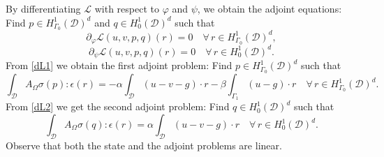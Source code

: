 \documentclass[preprint,9pt]{elsarticle}
\begin{document}
By differentiating $\mathcal{L}$ with respect to $\varphi$ and $\psi$,
we obtain the adjoint equations:
Find $p \in  H^1_{\Gamma_0}(\mathcal{D})^d$ and $ q\in H^1_0(\mathcal{D})^d$
such that
\begin{equation}\label{dL1}
	\partial_{\varphi}\mathcal{L}(u,v,p,q)(r)=0
	\quad \forall \, r \in  H^1_{\Gamma_0}(\mathcal{D})^d,
\end{equation}
\begin{equation}\label{dL2}
	\partial_{\psi}\mathcal{L}(u,v,p,q)(r)=0
	\quad\forall \, r \in  H^1_0(\mathcal{D})^d.
\end{equation}
From \eqref{dL1} we obtain the first adjoint problem:
Find $p \in  H^1_{\Gamma_0}(\mathcal{D})^d$ such that
\[
	\int_{\mathcal{D}} A_{\Omega}\sigma(p)\colon\!\epsilon(r) 
	= -\alpha \int_{\mathcal{D}} (u-v-g) \cdot r
	-\beta \int_{\Gamma_1} (u - g) \cdot r
	\quad \forall \, r \in H^1_{\Gamma_0}(\mathcal{D})^d.
\]
From \eqref{dL2} we get the second adjoint problem:
Find $q \in  H^1_{0}(\mathcal{D})^d$ such that
\begin{equation*} \label{eq:g-adj}
	\int_{\mathcal{D}} A_{\Omega}\sigma(q)\colon\!\epsilon(r) =
	\alpha \int_{\mathcal{D}} (u-v-g) \cdot r
	\quad \forall \, r \in  H^1_0(\mathcal{D})^d.
\end{equation*}
Observe that both the state and the adjoint problems are linear.
\end{document}
